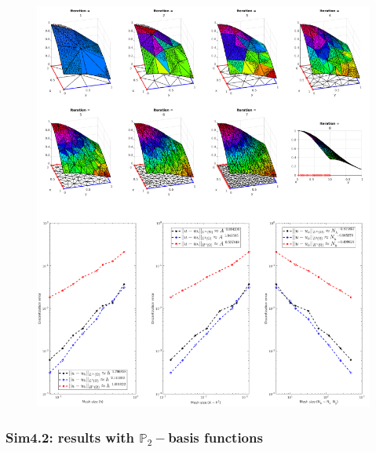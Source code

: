 \documentclass[12pt,openany,twoside,a4paper]{article}
\begin{document}
\begin{figure}[H]
    \centering
    \includegraphics[keepaspectratio,height=0.675\textheight]{sim4.1.png}
    \label{sim4.1}
\end{figure}

\newpage
\subsubsection{Sim4.2: results with $\mathbb{P}_2-$basis functions}
\end{document}
